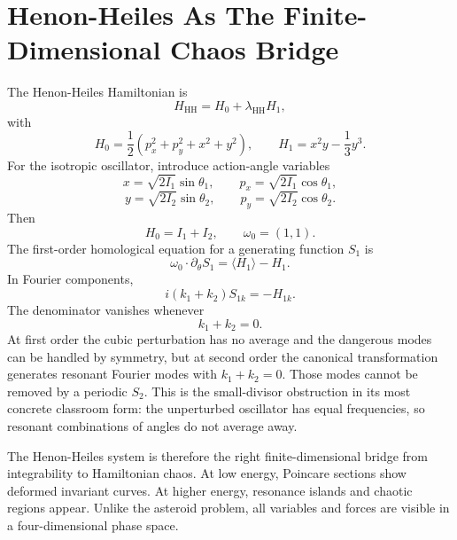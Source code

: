 \section{Henon-Heiles As The Finite-Dimensional Chaos Bridge}
\label{sec:lab-henon-heiles}

The Henon-Heiles Hamiltonian is
\[
  H_{\mathrm{HH}}
  =
  H_0+\lambda_{\mathrm{HH}}H_1,
\]
with
\[
  H_0=
  \frac12(p_x^2+p_y^2+x^2+y^2),
  \qquad
  H_1=x^2y-\frac13y^3.
\]
For the isotropic oscillator, introduce action-angle variables
\[
  x=\sqrt{2I_1}\sin\theta_1,
  \qquad
  p_x=\sqrt{2I_1}\cos\theta_1,
\]
\[
  y=\sqrt{2I_2}\sin\theta_2,
  \qquad
  p_y=\sqrt{2I_2}\cos\theta_2.
\]
Then
\[
  H_0=I_1+I_2,
  \qquad
  \omega_0=(1,1).
\]
The first-order homological equation for a generating function \(S_1\) is
\[
  \omega_0\cdot\partial_\theta S_1
  =
  \langle H_1\rangle-H_1.
\]
In Fourier components,
\[
  i(k_1+k_2)S_{1k}=-H_{1k}.
\]
The denominator vanishes whenever
\[
  k_1+k_2=0.
\]
At first order the cubic perturbation has no average and the dangerous modes
can be handled by symmetry, but at second order the canonical transformation
generates resonant Fourier modes with \(k_1+k_2=0\). Those modes cannot be
removed by a periodic \(S_2\). This is the small-divisor obstruction in its
most concrete classroom form: the unperturbed oscillator has equal
frequencies, so resonant combinations of angles do not average away.

The Henon-Heiles system is therefore the right finite-dimensional bridge from
integrability to Hamiltonian chaos. At low energy, Poincare sections show
deformed invariant curves. At higher energy, resonance islands and chaotic
regions appear. Unlike the asteroid problem, all variables and forces are
visible in a four-dimensional phase space.

